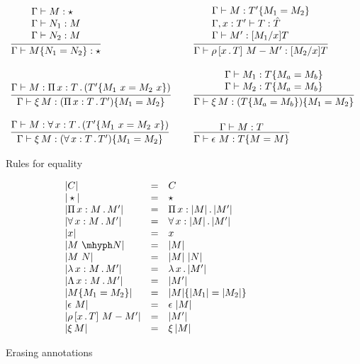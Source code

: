 \documentclass{article}
\begin{document}
\begin{figure}
  \[
  \begin{array}{lll}
  \infer{\Gamma \vdash \eqtm{N_1}{M}{N_2} : \star}{\begin{array}{l}\Gamma \vdash M : \star \\ \Gamma \vdash N_1 : M \\ \Gamma \vdash N_2 : M\end{array}}
  &\ &
  \infer{\Gamma \vdash \cng{x}{T}{M}{M'} : [M_2/x]T}
        {\begin{array}{l}\Gamma \vdash M : \eqtm{M_1}{T'}{M_2} \\ \Gamma , x : T' \vdash T : \hat{T} \\ \Gamma \vdash M' : [M_1/x]T
        \end{array}}
  \\ \\
     \infer{\Gamma \vdash \ext{M} : \eqtm{M_1}{(\Pia{x}{T}{T'})}{M_2}}{\Gamma \vdash M : \Pia{x}{T}{(\eqtm{M_1\ x}{T'}{M_2\ x})}}
    &\ &
          \infer{\Gamma \vdash \ext{M} : \eqtm{M_1}{(\eqtm{M_a}{T}{M_b})}{M_2}}
                {\begin{array}{l}\Gamma \vdash M_1 :\eqtm{M_a}{T}{M_b} \\ \Gamma \vdash M_2 : \eqtm{M_a}{T}{M_b} \end{array}}
\\ \\ 
     \infer{\Gamma \vdash \ext{M} : \eqtm{M_1}{(\allt{x}{T}{T'})}{M_2}}{\Gamma \vdash M : \allt{x}{T}{(\eqtm{M_1\ x}{T'}{M_2\ x})}}
    &\ & 
    \infer{\Gamma \vdash \rfl{M} : \eqtm{M}{T}{M}}{\Gamma \vdash M : T}

\end{array}
  \]
  \caption{Rules for equality}
  \label{fig:sartpeq}
  \end{figure}

\begin{figure}
  \[
  \begin{array}{lll}
    |C| & = & C \\
    |\star| & = & \star \\
    |\Pia{x}{M}{M'}| & = & \Pia{x}{|M|}{|M'|} \\
    |\allt{x}{M}{M'}| & = & \allt{x}{|M|}{|M'|} \\
    |x| & = & x \\
    |\appe{M}{N}| & = & |M| \\    
    |M\ N| & = & |M|\ |N| \\
    |\tlam{x}{M}{M'}| & = & \lam{x}{|M'|} \\
    |\Tlam{x}{M}{M'}| & = & |M'| \\
    |\eqtm{M_1}{M}{M_2}| & = & \eqtm{|M_1|}{|M|}{|M_2|}\\
    |\rfl{M}| & = & \rfl{|M|} \\
    |\cng{x}{T}{M}{M'}| & = & |M'| \\
    |\ext{M}| & = & \ext{|M|}
  \end{array}
  \]
  \caption{Erasing annotations}
  \label{fig:erase}
\end{figure}
\end{document}
